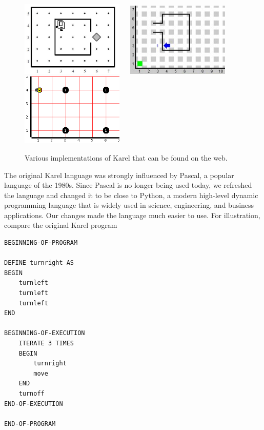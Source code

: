 \begin{figure}[!ht]
\begin{center}
\includegraphics[width=4.9cm]{img/intro-112.png}\ \ \ 
\includegraphics[width=4.9cm]{img/intro-113.png}\ \ \ 
\includegraphics[width=4.9cm]{img/intro-114.png}
\caption{Various implementations of Karel that can be found on the web.}
\vspace{-4mm}
\label{fig:intro-111}
\end{center}
\end{figure}
\noindent
The original Karel language was strongly influenced by Pascal, a popular
language of the 1980s. 
Since Pascal is no longer being used today, we refreshed 
the language and changed it to be close to Python, a modern high-level 
dynamic programming language that is widely used in science, engineering, 
and business applications. 
Our changes made the language much easier
to use. For illustration, compare the original Karel program\\

\begin{bbox}
\begin{verbatim}
BEGINNING-OF-PROGRAM
 
DEFINE turnright AS
BEGIN
    turnleft
    turnleft
    turnleft
END
 
BEGINNING-OF-EXECUTION
    ITERATE 3 TIMES
    BEGIN
        turnright
        move
    END
    turnoff
END-OF-EXECUTION
 
END-OF-PROGRAM
\end{verbatim}
\end{bbox}
\vspace{6mm}

